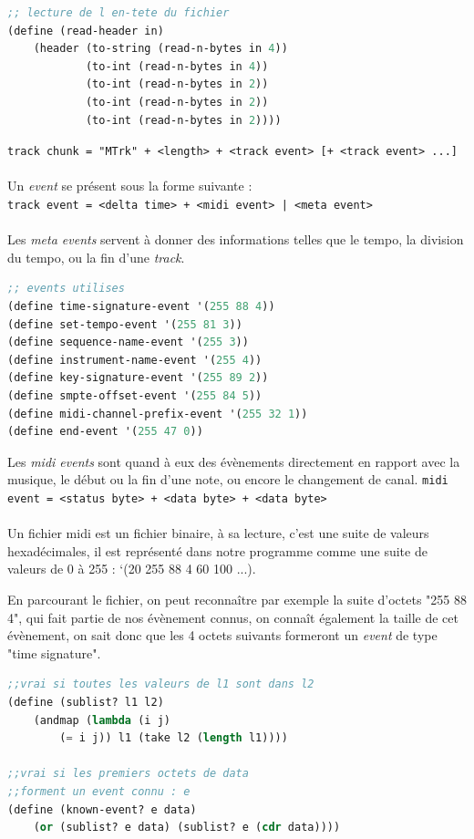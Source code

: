 \begin{lstlisting}[language=Lisp]
;; lecture de l en-tete du fichier
(define (read-header in)
    (header (to-string (read-n-bytes in 4))
            (to-int (read-n-bytes in 4))
            (to-int (read-n-bytes in 2))
            (to-int (read-n-bytes in 2))
            (to-int (read-n-bytes in 2))))
\end{lstlisting}
{\small \texttt{track chunk = "MTrk" + <length> + <track event> [+ <track event> ...]}}\\\\
Un \textit{event} se présent sous la forme suivante :\\
{\small \texttt{track event = <delta time> + <midi event> | <meta event>}}\\\\
Les \textit{meta events} servent à donner des informations telles que le tempo, la division du tempo, ou la fin d'une \textit{track}.\\

\begin{lstlisting}[language=Lisp]
;; events utilises
(define time-signature-event '(255 88 4))
(define set-tempo-event '(255 81 3))
(define sequence-name-event '(255 3))
(define instrument-name-event '(255 4))
(define key-signature-event '(255 89 2))
(define smpte-offset-event '(255 84 5))
(define midi-channel-prefix-event '(255 32 1))
(define end-event '(255 47 0))
\end{lstlisting}

Les \textit{midi events} sont quand à eux des évènements directement en rapport avec la musique, le début ou la fin d'une note, ou encore le changement de canal.
{\small \texttt{midi event = <status byte> + <data byte> + <data byte>}}\\\\
Un fichier midi est un fichier binaire, à sa lecture, c'est une suite de valeurs hexadécimales, il est représenté dans notre programme comme une suite de valeurs de 0 à 255 : ‘(20 255 88 4 60 100 ...).

En parcourant le fichier, on peut reconnaître par exemple la suite d'octets "255 88 4", qui fait partie de nos évènement connus, on connaît également la taille de cet évènement, on sait donc que les 4 octets suivants formeront un \textit{event} de type "time signature".\\

\begin{lstlisting}[language=Lisp]
;;vrai si toutes les valeurs de l1 sont dans l2
(define (sublist? l1 l2)
    (andmap (lambda (i j)
        (= i j)) l1 (take l2 (length l1))))

;;vrai si les premiers octets de data
;;forment un event connu : e
(define (known-event? e data)
    (or (sublist? e data) (sublist? e (cdr data))))
\end{lstlisting}

